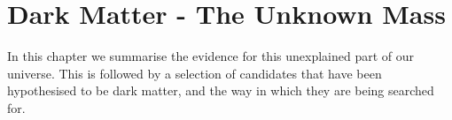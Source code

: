 \chapter{Dark Matter - The Unknown Mass}
\label{chap:dark_matter_evidence}

\par
In this chapter we summarise the evidence for this unexplained part of our universe.
This is followed by a selection of candidates that have been hypothesised to be dark matter, and the way in which they are being searched for.




